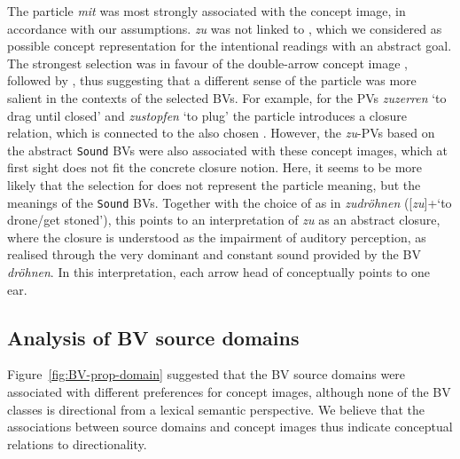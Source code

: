 \documentclass[output=paper]{langsci/langscibook}
\begin{document}
The particle \textit{mit} was most strongly associated with the
 concept image, in accordance with our assumptions. \textit{zu}
was not linked to , which we considered as
possible concept representation for the intentional readings with an
abstract goal. The strongest selection was in favour of the
double-arrow concept image , followed by , thus
suggesting that a different sense of the particle was more salient in
the contexts of the selected BVs. For example, for the PVs
\textit{zuzerren} `to drag until closed' and \textit{zustopfen} `to
plug' the particle introduces a closure relation, which is connected
to the also chosen . However, the \textit{zu}-PVs
based on the abstract \texttt{Sound} BVs were also associated with
these concept images, which at first sight does not fit the concrete closure
notion. Here, it seems to be more likely that the selection for
 does not represent the particle meaning, but the
meanings of the \texttt{Sound} BVs. Together with the choice of
 as in \textit{zudröhnen} ([\textit{zu}]+`to drone/get
stoned'), this points to an interpretation of \textit{zu} as an
abstract closure, where the closure is understood as the impairment of
auditory perception, as realised through the very dominant and
constant sound provided by the BV \textit{dröhnen}. In this
interpretation, each arrow head of  conceptually
points to one ear.

\subsection{Analysis of BV source domains}
\label{sec:disc-domain}

Figure~\ref{fig:BV-prop-domain} suggested that the BV source domains
were associated with different preferences for concept images,
although none of the BV classes is directional from a lexical semantic
perspective. We believe that the associations between source domains
and concept images thus indicate conceptual relations to
directionality.
\end{document}

